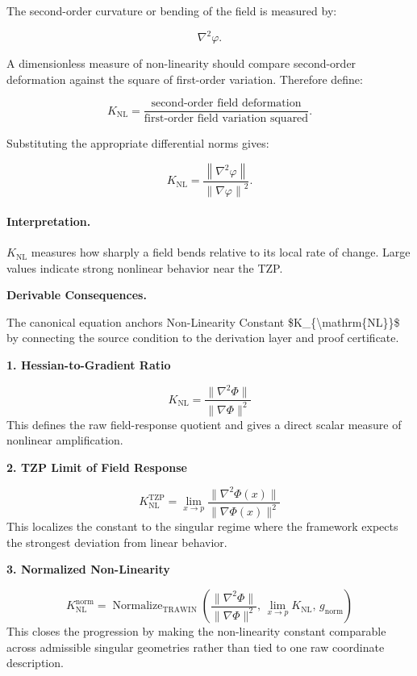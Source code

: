 The second-order curvature or bending of the field is measured by:

\begin{equation}
\nabla^2\varphi .
\end{equation}

A dimensionless measure of non-linearity should compare second-order deformation against the square of first-order variation. Therefore define:

\begin{equation}
K_{\mathrm{NL}}
=
\frac{\text{second-order field deformation}}
{\text{first-order field variation squared}} .
\end{equation}

Substituting the appropriate differential norms gives:

\begin{equation}
\boxed{
K_{\mathrm{NL}}
=
\frac{\left\lVert \nabla^{2}\varphi\right\rVert}
{\left\lVert \nabla\varphi\right\rVert^{2}} .
}
\end{equation}

\paragraph{Interpretation.}
$K_{\mathrm{NL}}$ measures how sharply a field bends relative to its local rate of change. Large values indicate strong nonlinear behavior near the TZP.

\par\vspace{0.35em}
\noindent\textbf{Derivable Consequences.}\quad
\begingroup
\footnotesize
\raggedright
The canonical equation anchors Non-Linearity Constant \$K\_\{\textbackslash{}mathrm\{NL\}\}\$ by connecting the source condition to the derivation layer and proof certificate.
\par\endgroup

\noindent\textbf{1. Hessian-to-Gradient Ratio}\par
\[
K_{\mathrm{NL}}
=
\frac{\lVert \nabla^{2}\Phi \rVert}{\lVert \nabla\Phi \rVert^{2}}
\]
\noindent This defines the raw field-response quotient and gives a direct scalar measure of nonlinear amplification.\par
\noindent\textbf{2. TZP Limit of Field Response}\par
\[
K_{\mathrm{NL}}^{\mathrm{TZP}}
=
\lim_{x \to p}
\frac{\lVert \nabla^{2}\Phi(x) \rVert}{\lVert \nabla\Phi(x) \rVert^{2}}
\]
\noindent This localizes the constant to the singular regime where the framework expects the strongest deviation from linear behavior.\par
\noindent\textbf{3. Normalized Non-Linearity}\par
\[
K_{\mathrm{NL}}^{\mathrm{norm}}
=
\operatorname{Normalize}_{\mathrm{TRAWIN}}
\!\left(
\frac{\lVert \nabla^{2}\Phi \rVert}{\lVert \nabla\Phi \rVert^{2}},\,
\lim_{x \to p} K_{\mathrm{NL}},\,
g_{\mathrm{norm}}
\right)
\]
\noindent This closes the progression by making the non-linearity constant comparable across admissible singular geometries rather than tied to one raw coordinate description.\par

